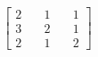 \documentclass[preview]{standalone}
\begin{document}
\begin{align*}
\begin{bmatrix} 2 & \quad 1 & \quad 1 \\ 3 & \quad 2 & \quad 1 \\ 2 & \quad 1 & \quad 2 \end{bmatrix}
\end{align*}
\end{document}
